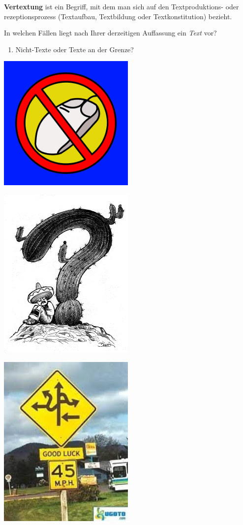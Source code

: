 \documentclass[
  letterpaper,
  DIV=11,
  numbers=noendperiod]{scrreprt}
\providecommand{\tightlist}{%
  \setlength{\itemsep}{0pt}\setlength{\parskip}{0pt}}\usepackage{longtable,booktabs,array}
\begin{document}
\textbf{Vertextung} ist ein Begriff, mit dem man sich auf den
Textproduktions- oder rezeptionsprozess (Textaufbau, Textbildung oder
Textkonstitution) bezieht.

In welchen Fällen liegt nach Ihrer derzeitigen Auffassung ein
\emph{Text} vor?

\begin{enumerate}
\def\labelenumi{(\arabic{enumi})}
\tightlist
\item
  Nicht-Texte oder Texte an der Grenze?
\end{enumerate}

\includegraphics[width=0.5\textwidth,height=\textheight]{./pictures/textkriterien_1.png}

\includegraphics[width=0.5\textwidth,height=\textheight]{./pictures/textkriterien_2.png}

\includegraphics[width=0.5\textwidth,height=\textheight]{./pictures/textkriterien_5.jpg}
\end{document}
